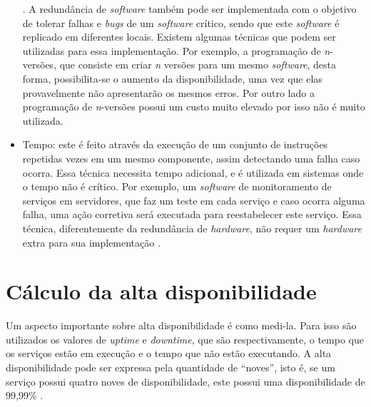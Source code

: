 \begin{itemize}
 \cite{viana201}. A redundância de \textit{software} também pode ser implementada com o objetivo de tolerar falhas e \textit{bugs} de um
 \textit{software} crítico, sendo que este \textit{software} é replicado em diferentes locais. Existem algumas técnicas que podem ser 
 utilizadas para essa implementação. Por exemplo, a programação de \textit{n}-versões, que consiste em criar \textit{n} versões para um 
 mesmo \textit{software}, desta forma, possibilita-se o aumento da disponibilidade, uma vez que elas provavelmente não apresentarão os 
 mesmos erros. Por outro lado a programação de \textit{n}-versões possui um custo muito elevado por isso não é muito utilizada.
 \item Tempo: este é feito através da execução de um conjunto de instruções repetidas vezes em um mesmo componente, assim detectando uma 
 falha caso ocorra. Essa técnica necessita tempo adicional, e é utilizada em sistemas onde o tempo não é crítico. Por exemplo, um 
 \textit{software} de monitoramento de serviços em servidores, que faz um teste em cada serviço e caso ocorra alguma falha, uma ação 
 corretiva  será executada para reestabelecer este serviço. Essa técnica, diferentemente da redundância de \textit{hardware}, não requer 
 um \textit{hardware} extra para sua implementação \cite{costa2009}.
\end{itemize}

\section{Cálculo da alta disponibilidade}

Um aspecto importante sobre alta disponibilidade é como medi-la. Para isso são utilizados os valores de \textit{uptime} e \textit{downtime}, 
que são respectivamente, o tempo que os serviços estão em execução e o tempo que não estão executando. A alta disponibilidade 
pode ser expressa pela quantidade de ``noves'', isto é, se um serviço possui quatro noves de disponibilidade, este possui uma 
disponibilidade de 99,99\% \cite{pereirafilho2004}.

